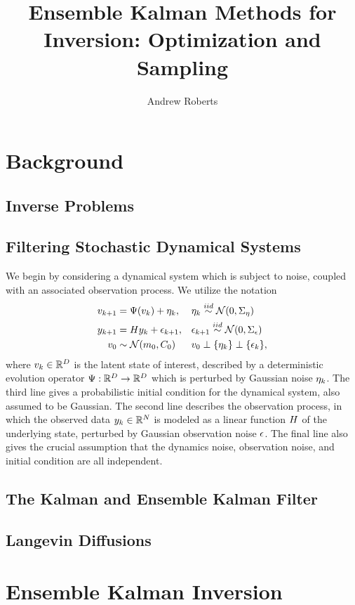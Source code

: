 \documentclass[12pt]{article}
\title{Ensemble Kalman Methods for Inversion: Optimization and Sampling}
\author{Andrew Roberts}
\begin{document}
\maketitle
\newpage

\section{Background}

\subsection{Inverse Problems}

\subsection{Filtering Stochastic Dynamical Systems}
We begin by considering a dynamical system which is subject to noise, coupled with an associated observation process. 
We utilize the notation 
\begin{align}
\dstate[\timeStep+1] &= \fwdOne(\dstate) + \indexTimeStep{\noiseDynamic}, 	  &&\indexTimeStep{\noiseDynamic} \overset{iid}{\sim} \Gaussian(0, \CovNoiseDynamic) \label{dynamic_model} \\
\ddataObs[\timeStep+1] &= \obsOpLin \ddataObs + \indexTimeStep[\timeStep+1]{\noiseObs}, &&\indexTimeStep[\timeStep+1]{\noiseObs} \overset{iid}{\sim} \Gaussian(0, \CovNoiseObs) \nonumber \\
\dstate[0] &\sim \Gaussian(\stateMean[0], \stateCov[0]) && \nonumber \dstate[0] \perp \{\indexTimeStep{\noiseDynamic}\} \perp \{\indexTimeStep{\noiseObs}\}, \nonumber 
\end{align}
where $\dstate \in \R^{\dimState}$ is the latent state of interest, described by a deterministic evolution operator $\fwdOne: \R^{\dimState} \to \R^{\dimState}$ which is perturbed by 
Gaussian noise $\indexTimeStep{\noiseDynamic}$. The third line gives a probabilistic initial condition for the dynamical system, also assumed to be Gaussian. 
The second line describes the observation process, in which the observed data $\ddataObs \in \R^{\dimObs}$ is modeled as a linear 
function $\obsOpLin$ of the underlying state, perturbed by Gaussian observation noise $\noiseObs$. The final line also gives the crucial assumption that the dynamics noise, observation 
noise, and initial condition are all independent. 


\subsection{The Kalman and Ensemble Kalman Filter}
\subsection{Langevin Diffusions}

\section{Ensemble Kalman Inversion}
\end{document}

